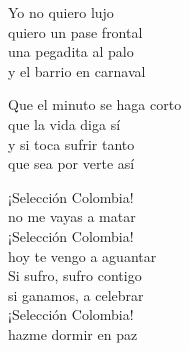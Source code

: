 \begin{lyrics}
Yo no quiero lujo\\
quiero un pase frontal\\
una pegadita al palo\\
y el barrio en carnaval

Que el minuto se haga corto\\
que la vida diga sí\\
y si toca sufrir tanto\\
que sea por verte así

¡Selección Colombia!\\
no me vayas a matar\\
¡Selección Colombia!\\
hoy te vengo a aguantar\\
Si sufro, sufro contigo\\
si ganamos, a celebrar\\
¡Selección Colombia!\\
hazme dormir en paz
\end{lyrics}

